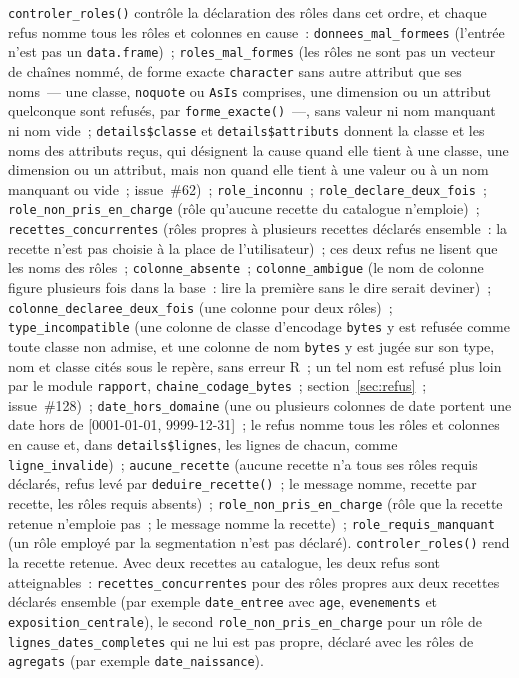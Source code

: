 \documentclass[a4paper,11pt]{article}
\newcommand{\code}[1]{\texttt{\small #1}}
\begin{document}
\code{controler\_roles()} contrôle la déclaration des rôles dans cet ordre, et
chaque refus nomme tous les rôles et colonnes en cause~:
\code{donnees\_mal\_formees} (l'entrée n'est pas un \code{data.frame})~;
\code{roles\_mal\_formes} (les rôles ne sont pas un vecteur de chaînes nommé,
de forme exacte \code{character} sans autre attribut que ses noms~--- une
classe, \code{noquote} ou \code{AsIs} comprises, une dimension ou un
attribut quelconque sont refusés, par \code{forme\_exacte()}~---, sans
valeur ni nom manquant ni nom vide~; \code{details\$classe} et
\code{details\$attributs} donnent la classe et les noms des attributs reçus,
qui désignent la cause quand elle tient à une classe, une dimension ou un
attribut, mais non quand elle tient à une valeur ou à un nom manquant ou
vide~; issue~\#62)~; \code{role\_inconnu}~;
\code{role\_declare\_deux\_fois}~; \code{role\_non\_pris\_en\_charge} (rôle
qu'aucune recette du catalogue n'emploie)~; \code{recettes\_concurrentes}
(rôles propres à plusieurs recettes déclarés ensemble~: la recette n'est pas
choisie à la place de l'utilisateur)~; ces deux refus ne lisent que les noms
des rôles~; \code{colonne\_absente}~; \code{colonne\_ambigue} (le nom de colonne figure
plusieurs fois dans la base~: lire la première sans le dire serait deviner)~;
\code{colonne\_declaree\_deux\_fois} (une colonne pour deux rôles)~;
\code{type\_incompatible} (une colonne de classe d'encodage
\code{bytes} y est refusée comme toute classe non admise, et une colonne
de nom \code{bytes} y est jugée sur son type, nom et classe cités sous le
repère, sans erreur R~; un tel nom est refusé plus loin par le module
\code{rapport}, \code{chaine\_codage\_bytes}~; section~\ref{sec:refus}~;
issue~\#128)~; \code{date\_hors\_domaine} (une ou plusieurs
colonnes de date portent une date hors de [0001-01-01, 9999-12-31]~; le refus
nomme tous les rôles et colonnes en cause et, dans \code{details\$lignes},
les lignes de chacun, comme \code{ligne\_invalide})~;
\code{aucune\_recette} (aucune recette n'a tous ses rôles requis
déclarés, refus levé par \code{deduire\_recette()}~; le message nomme,
recette par recette, les rôles requis absents)~;
\code{role\_non\_pris\_en\_charge} (rôle que la recette retenue n'emploie
pas~; le message nomme la recette)~; \code{role\_requis\_manquant}
(un rôle employé par la segmentation n'est pas déclaré).
\code{controler\_roles()} rend la recette retenue. Avec deux recettes au
catalogue, les deux refus sont atteignables~: \code{recettes\_concurrentes}
pour des rôles propres aux deux recettes déclarés ensemble (par exemple
\code{date\_entree} avec \code{age}, \code{evenements} et
\code{exposition\_centrale}), le second \code{role\_non\_pris\_en\_charge}
pour un rôle de \code{lignes\_dates\_completes} qui ne lui est pas propre,
déclaré avec les rôles de \code{agregats} (par exemple
\code{date\_naissance}).
\end{document}
